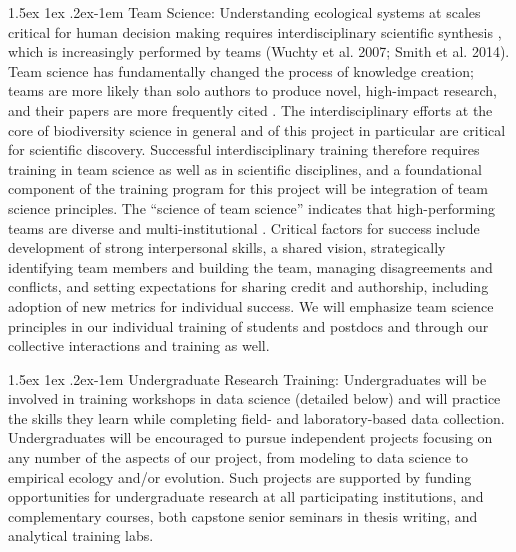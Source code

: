 \documentclass[11pt]{article}
\makeatletter
\renewcommand{\paragraph}{\@startsection{paragraph}{4}{\z@}
  {1.5ex \@plus 1ex \@minus .2ex}{-1em}
  {\normalfont\normalsize\it}
}
\makeatother
\begin{document}
\paragraph{Team Science:} Understanding ecological systems at scales
critical for human decision making requires interdisciplinary
scientific synthesis \citep{goring2014}, which is increasingly
performed by teams (Wuchty et al. 2007; Smith et al. 2014). Team
science has fundamentally changed the process of knowledge creation;
teams are more likely than solo authors to produce novel, high-impact
research, and their papers are more frequently cited
\citep{wuchty2007}. The interdisciplinary efforts at the core of
biodiversity science in general and of this project in particular are
critical for scientific discovery. Successful interdisciplinary
training therefore requires training in team science as well as in
scientific disciplines, and a foundational component of the training
program for this project will be integration of team science
principles.  The ``science of team science'' indicates that
high-performing teams are diverse \citep{cheruvelil2014} and
multi-institutional \citep{jones2008}. Critical factors for success
include development of strong interpersonal skills, a shared vision,
strategically identifying team members and building the team, managing
disagreements and conflicts, and setting expectations for sharing
credit and authorship\citep{goring2014, cheruvelil2014}, including
adoption of new metrics for individual success. We will emphasize team
science principles in our individual training of students and postdocs
and through our collective interactions and training as well.

\paragraph{Undergraduate Research Training:} Undergraduates will be
involved in training workshops in data science (detailed below) and
will practice the skills they learn while completing field- and
laboratory-based data collection. Undergraduates will be encouraged to
pursue independent projects focusing on any number of the aspects of
our project, from modeling to data science to empirical ecology and/or
evolution. Such projects are supported by funding opportunities for
undergraduate research at all participating institutions, and
complementary courses, both capstone senior seminars in thesis
writing, and analytical training labs.
\end{document}
